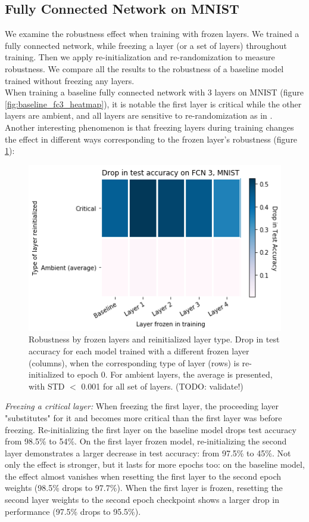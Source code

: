 \documentclass{article}
\begin{document}
\subsection{Fully Connected Network on MNIST}
We examine the robustness effect when training with frozen layers. We trained a fully connected network, while freezing a layer (or a set of layers) throughout training. Then we apply re-initialization and re-randomization to measure robustness. We compare all the results to the robustness of a baseline model trained without freezing any layers.\\
When training a baseline fully connected network with 3 layers on MNIST (figure \ref{fig:baseline_fc3_heatmap}), it is notable the first layer is critical while the other layers are ambient, and all layers are sensitive to re-randomization as in \cite{allLayers}.\\
Another interesting phenomenon is that freezing layers during training changes the effect in different ways corresponding to the frozen layer's robustness (figure \ref{fig:fc3_drop_by_layer_type}):\\ 
\begin{figure}
  \includegraphics[width=\linewidth]{images/fc3_mnist_drop_in_acc_by_layer.png}
  \caption{Robustness by frozen layers and reinitialized layer type. Drop in test accuracy for each model trained with a different frozen layer (columns), when the corresponding type of layer (rows) is re-initialized to epoch 0. For ambient layers, the average is presented, with STD $<$ 0.001 for all set of layers. (TODO: validate!)}
  \label{fig:fc3_drop_by_layer_type}
\end{figure}
\emph{Freezing a critical layer:} When freezing the first layer, the proceeding layer "substitutes" for it and becomes more critical than the first layer was before freezing. Re-initializing the first layer on the baseline model drops test accuracy from 98.5\% to 54\%. On the first layer frozen model, re-initializing the second layer demonstrates a larger decrease in test accuracy: from 97.5\% to 45\%. Not only the effect is stronger, but it lasts for more epochs too: on the baseline model, the effect almost vanishes when resetting the first layer to the second epoch weights (98.5\% drops to 97.7\%). When the first layer is frozen, resetting the second layer weights to the second epoch checkpoint shows a larger drop in performance (97.5\% drops to 95.5\%).\\
\end{document}
